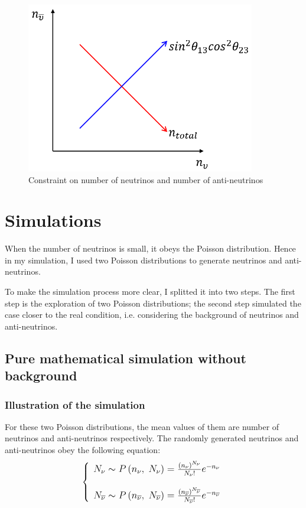 \documentclass[a4paper,12pt]{article}
\begin{document}
\begin{figure}[htbp]
    \centering
    \includegraphics[width=10cm]{Images/axis.png}
    \caption{Constraint on number of neutrinos and number of anti-neutrinos}
    \label{constraint}
\end{figure} 


\section{Simulations}
When the number of neutrinos is small, it obeys the Poisson distribution. Hence in my simulation, I used two Poisson distributions to generate neutrinos and anti-neutrinos.  

To make the simulation process more clear, I splitted it into two steps. The first step is the exploration of two Poisson distributions; the second step simulated the case closer to the real condition, i.e. considering the background of neutrinos and anti-neutrinos.

\subsection{Pure mathematical simulation without background}
\subsubsection{Illustration of the simulation}
For these two Poisson distributions, the mean values of them are number of neutrinos and anti-neutrinos respectively. The randomly generated neutrinos and anti-neutrinos obey the following equation:
\begin{equation}
\large
    \left\{\begin{array}{l}N_\nu\sim P\left(n_\nu,\;N_\nu\right)=\frac{\left(n_\nu\right)^{N_\nu}}{N_\nu!}e^{-n_\nu}\\\\N_{\overline\nu}\sim P\left(n_{\overline\nu},\;N_{\overline\nu}\right)=\frac{\left(n_{\overline\nu}\right)^{N_{\overline\nu}}}{N_{\overline\nu}!}e^{-n_{\overline\nu}}\end{array}\right.
\end{equation}
\end{document}
